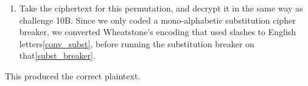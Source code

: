\begin{enumerate}[resume]
    \item Take the ciphertext for this permutation, and decrypt it in the same way as challenge 10B. Since we only coded a mono-alphabetic substitution cipher breaker, we converted Wheatstone's encoding that used slashes to English letters\cref{conv_subst}, before running the substitution breaker on that\cref{subst_breaker}.
\end{enumerate}

This produced the correct plaintext.